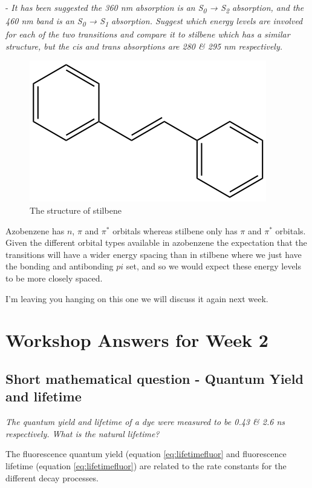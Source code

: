 \documentclass[
]{book}
\begin{document}
- \emph{It has been suggested the 360 nm absorption is an S\textsubscript{0} → S\textsubscript{2} absorption, and the 460 nm band is an S\textsubscript{0} → S\textsubscript{1} absorption. Suggest which energy levels are involved for each of the two transitions and compare it to stilbene which has a similar structure, but the cis and trans absorptions are 280 \& 295 nm respectively.}

\begin{figure}

{\centering \includegraphics[width=0.3\linewidth]{images/stilbene} 

}

\caption{The  structure of stilbene}\label{fig:stilbene}
\end{figure}

Azobenzene has \(n\), \(\pi\) and \(\pi^*\) orbitals whereas stilbene only has \(\pi\) and \(\pi^*\) orbitals. Given the different orbital types available in azobenzene the expectation that the transitions will have a wider energy spacing than in stilbene where we just have the bonding and antibonding \(pi\) set, and so we would expect these energy levels to be more closely spaced.

I'm leaving you hanging on this one we will discuss it again next week.

\hypertarget{ch:Workshop2}{%
\chapter{Workshop Answers for Week 2}\label{ch:Workshop2}}

\hypertarget{sec:YieldLifetime}{%
\section{Short mathematical question - Quantum Yield and lifetime}\label{sec:YieldLifetime}}

\emph{The quantum yield and lifetime of a dye were measured to be 0.43 \& 2.6 ns respectively. What is the natural lifetime?}

The fluorescence quantum yield (equation \eqref{eq:lifetimefluor} and fluorescence lifetime (equation \eqref{eq:lifetimefluor}) are related to the rate constants for the different decay processes.
\end{document}
